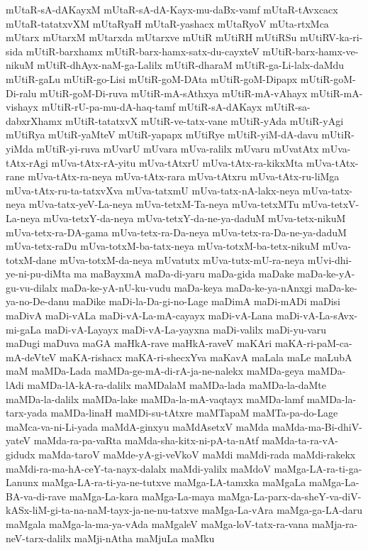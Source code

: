 {mUtaR-sA-dAKayxM
mUtaR-sA-dA-Kayx-mu-daBx-vamf
mUtaR-tAvxcacx
mUtaR-tatatxvXM
mUtaRyaH
mUtaR-yashacx
mUtaRyoV
mUta-rtxMca
mUtarx
mUtarxM
mUtarxda
mUtarxve
mUtiR
mUtiRH
mUtiRSu
mUtiRV-ka-ri-sida
mUtiR-barxhamx
mUtiR-barx-hamx-satx-du-cayxteV
mUtiR-barx-hamx-ve-nikuM
mUtiR-dhAyx-naM-ga-Lalilx
mUtiR-dharaM
mUtiR-ga-Li-lalx-daMdu
mUtiR-gaLu
mUtiR-go-Lisi
mUtiR-goM-DAta
mUtiR-goM-Dipapx
mUtiR-goM-Di-ralu
mUtiR-goM-Di-ruva
mUtiR-mA-sAthxya
mUtiR-mA-vAhayx
mUtiR-mA-vishayx
mUtiR-rU-pa-mu-dA-haq-tamf
mUtiR-sA-dAKayx
mUtiR-sa-dabxrXhamx
mUtiR-tatatxvX
mUtiR-ve-tatx-vane
mUtiR-yAda
mUtiR-yAgi
mUtiRya
mUtiR-yaMteV
mUtiR-yapapx
mUtiRye
mUtiR-yiM-dA-davu
mUtiR-yiMda
mUtiR-yi-ruva
mUvarU
mUvara
mUva-ralilx
mUvaru
mUvatAtx
mUva-tAtx-rAgi
mUva-tAtx-rA-yitu
mUva-tAtxrU
mUva-tAtx-ra-kikxMta
mUva-tAtx-rane
mUva-tAtx-ra-neya
mUva-tAtx-rara
mUva-tAtxru
mUva-tAtx-ru-liMga
mUva-tAtx-ru-ta-tatxvXva
mUva-tatxmU
mUva-tatx-nA-lakx-neya
mUva-tatx-neya
mUva-tatx-yeV-La-neya
mUva-tetxM-Ta-neya
mUva-tetxMTu
mUva-tetxV-La-neya
mUva-tetxY-da-neya
mUva-tetxY-da-ne-ya-daduM
mUva-tetx-nikuM
mUva-tetx-ra-DA-gama
mUva-tetx-ra-Da-neya
mUva-tetx-ra-Da-ne-ya-daduM
mUva-tetx-raDu
mUva-totxM-ba-tatx-neya
mUva-totxM-ba-tetx-nikuM
mUva-totxM-dane
mUva-totxM-da-neya
mUvatutx
mUva-tutx-mU-ra-neya
mUvi-dhi-ye-ni-pu-diMta
ma
maBayxmA
maDa-di-yaru
maDa-gida
maDake
maDa-ke-yA-gu-vu-dilalx
maDa-ke-yA-nU-ku-vudu
maDa-keya
maDa-ke-ya-nAnxgi
maDa-ke-ya-no-De-danu
maDike
maDi-la-Da-gi-no-Lage
maDimA
maDi-mADi
maDisi
maDivA
maDi-vALa
maDi-vA-La-mA-cayayx
maDi-vA-Lana
maDi-vA-La-sAvx-mi-gaLa
maDi-vA-Layayx
maDi-vA-La-yayxna
maDi-valilx
maDi-yu-varu
maDugi
maDuva
maGA
maHkA-rave
maHkA-raveV
maKAri
maKA-ri-paM-ca-mA-deVteV
maKA-rishacx
maKA-ri-shecxYva
maKavA
maLala
maLe
maLubA
maM
maMDa-Lada
maMDa-ge-mA-di-rA-ja-ne-nalekx
maMDa-geya
maMDa-lAdi
maMDa-lA-kA-ra-dalilx
maMDalaM
maMDa-lada
maMDa-la-daMte
maMDa-la-dalilx
maMDa-lake
maMDa-la-mA-vaqtayx
maMDa-lamf
maMDa-la-tarx-yada
maMDa-linaH
maMDi-su-tAtxre
maMTapaM
maMTa-pa-do-Lage
maMca-va-ni-Li-yada
maMdA-ginxyu
maMdAsetxV
maMda
maMda-ma-Bi-dhiV-yateV
maMda-ra-pa-vaRta
maMda-sha-kitx-ni-pA-ta-nAtf
maMda-ta-ra-vA-gidudx
maMda-taroV
maMde-yA-gi-veVkoV
maMdi
maMdi-rada
maMdi-rakekx
maMdi-ra-ma-hA-ceY-ta-nayx-dalalx
maMdi-yalilx
maMdoV
maMga-LA-ra-ti-ga-Lanunx
maMga-LA-ra-ti-ya-ne-tutxve
maMga-LA-tamxka
maMgaLa
maMga-La-BA-va-di-rave
maMga-La-kara
maMga-La-maya
maMga-La-parx-da-sheY-va-diV-kASx-liM-gi-ta-na-naM-tayx-ja-ne-nu-tatxve
maMga-La-vAra
maMga-ga-LA-daru
maMgala
maMga-la-ma-ya-vAda
maMgaleV
maMga-loV-tatx-ra-vana
maMja-ra-neV-tarx-dalilx
maMji-nAtha
maMjuLa
maMku
}
